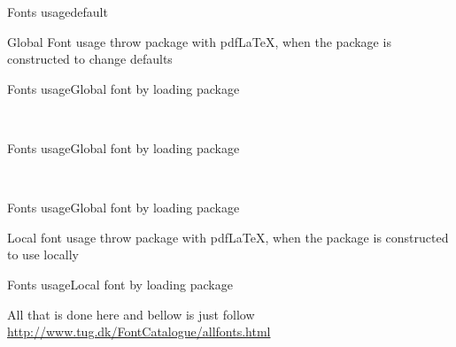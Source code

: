 \begin{frame}[t, fragile]{Fonts usage}{default}\relax

\relax

\ncol\usepackage{fontenc}

\end{frame}

\begin{frame}
     \centering\huge Global Font usage throw package with pdf\LaTeX, when the package is constructed to change defaults
     
\end{frame}

\begin{frame}[t, fragile]{Fonts usage}{Global font by loading package}\relax

\relax

\ncol\usepackage{<fontPackage>}\\
\Oncol\usepackage[T1]{fontenc}

     
\end{frame}

\begin{frame}[t, fragile]{Fonts usage}{Global font by loading package}\relax

\relax

\ncol\usepackage{<fontPackage>}\\
\Oncol\usepackage[LY1]{fontenc}
\end{frame}

\begin{frame}[t, fragile]{Fonts usage}{Global font by loading package}\relax

\relax

\end{frame}

\begin{frame}
     \centering\huge Local font usage throw package with pdf\LaTeX, when the package is constructed to use locally
\end{frame}

\begin{frame}[t, fragile]{Fonts usage}{Local font by loading package}\relax

\relax

All that is done here and bellow is just follow \url{http://www.tug.dk/FontCatalogue/allfonts.html}

\end{frame}

